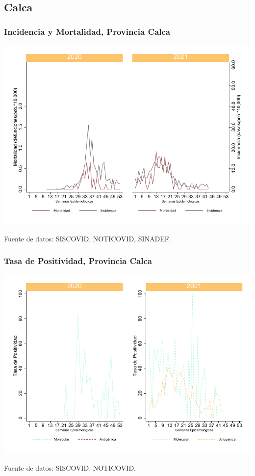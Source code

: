 \documentclass[xcolor=table]{beamer}
\begin{document}
\subsection{Calca}

\begin{frame}[label=Calca]
	\frametitle{Incidencia y Mortalidad, Provincia Calca}
	\vspace{-.5cm}
	\begin{center}
		\includegraphics[width=0.8\linewidth, trim={0cm .5cm 0cm 0.2cm},clip]{../figuras/incidencia_mortalidad_20_21_3.pdf}
	\end{center}
	{\tiny Fuente de datos: SISCOVID, NOTICOVID, SINADEF.}
\end{frame}

\begin{frame}
	\frametitle{Tasa de Positividad, Provincia Calca}
	\vspace{-.5cm}
	\begin{center}
		\includegraphics[width=0.8\linewidth, trim={0cm .5cm 0cm 0.2cm},clip]{../figuras/positividad_20_21_3.pdf}
	\end{center}
	{\tiny Fuente de datos: SISCOVID, NOTICOVID.}
\end{frame}
\end{document}
